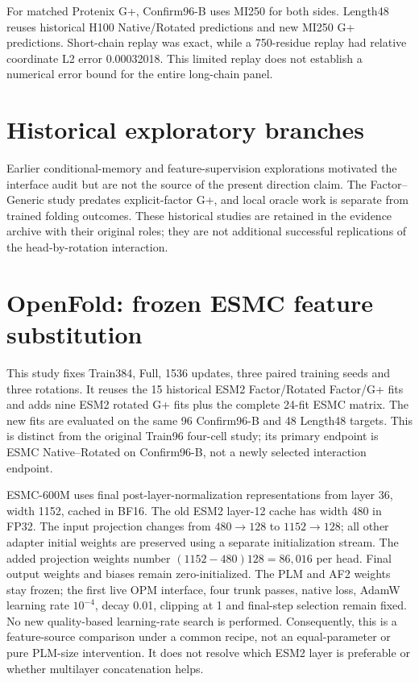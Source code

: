 For matched Protenix G+, Confirm96-B uses MI250 for both sides. Length48 reuses
historical H100 Native/Rotated predictions and new MI250 G+ predictions.
Short-chain replay was exact, while a 750-residue replay had relative coordinate
L2 error 0.00032018. This limited replay does not establish a numerical error
bound for the entire long-chain panel.

\section{Historical exploratory branches}
\label{app:historical}
Earlier conditional-memory and feature-supervision explorations motivated the
interface audit but are not the source of the present direction claim. The
Factor--Generic study predates explicit-factor G+, and local oracle work is
separate from trained folding outcomes. These historical studies are retained
in the evidence archive with their original roles; they are not additional
successful replications of the head-by-rotation interaction.


\section{OpenFold: frozen ESMC feature substitution}
\label{app:esmc}
This study fixes Train384, Full, 1536 updates, three paired training seeds and
three rotations. It reuses the 15 historical ESM2 Factor/Rotated Factor/G+
fits and adds nine ESM2 rotated G+ fits plus the complete 24-fit ESMC matrix.
The new fits are evaluated on the same 96 Confirm96-B and 48 Length48 targets.
This is distinct from the original Train96 four-cell study; its primary endpoint
is ESMC Native--Rotated on Confirm96-B, not a newly selected interaction endpoint.

ESMC-600M uses final post-layer-normalization representations from layer 36,
width 1152, cached in BF16. The old ESM2 layer-12 cache has width 480 in FP32.
The input projection changes from $480\!\to\!128$ to $1152\!\to\!128$;
all other adapter initial weights are preserved using a separate initialization
stream. The added projection weights number $(1152-480)128=86{,}016$ per
head. Final output weights and biases remain zero-initialized. The PLM and AF2
weights stay frozen; the first live OPM interface, four trunk passes, native
loss, AdamW learning rate $10^{-4}$, decay 0.01, clipping at 1 and final-step
selection remain fixed. No new quality-based learning-rate search is performed.
Consequently, this is a feature-source comparison under a common recipe, not
an equal-parameter or pure PLM-size intervention. It does not resolve which
ESM2 layer is preferable or whether multilayer concatenation helps.

